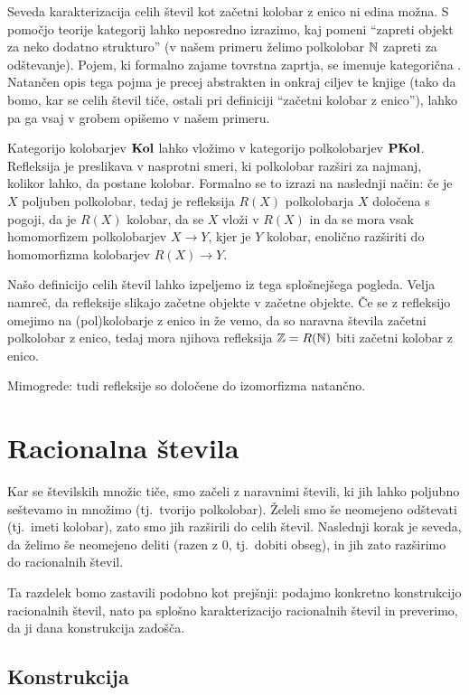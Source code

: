 Seveda karakterizacija celih števil kot začetni kolobar z enico ni edina možna. S pomočjo teorije kategorij lahko neposredno izrazimo, kaj pomeni ``zapreti objekt za neko dodatno strukturo'' (v našem primeru želimo polkolobar $\mathbb{N}$ zapreti za odštevanje). Pojem, ki formalno zajame tovrstna zaprtja, se imenuje kategorična . Natančen opis tega pojma je precej abstrakten in onkraj ciljev te knjige (tako da bomo, kar se celih števil tiče, ostali pri definiciji ``začetni kolobar z enico''), lahko pa ga vsaj v grobem opišemo v našem primeru.

Kategorijo kolobarjev $\mathbf{Kol}$ lahko vložimo v kategorijo polkolobarjev $\mathbf{PKol}$. Refleksija je preslikava v nasprotni smeri, ki polkolobar razširi za najmanj, kolikor lahko, da postane kolobar. Formalno se to izrazi na naslednji način: če je $X$ poljuben polkolobar, tedaj je refleksija $R(X)$ polkolobarja $X$ določena s pogoji, da je $R(X)$ kolobar, da se $X$ vloži v $R(X)$ in da se mora vsak homomorfizem polkolobarjev $X \to Y$, kjer je $Y$ kolobar, enolično razširiti do homomorfizma kolobarjev $R(X) \to Y$.

Našo definicijo celih števil lahko izpeljemo iz tega splošnejšega pogleda. Velja namreč, da refleksije slikajo začetne objekte v začetne objekte. Če se z refleksijo omejimo na (pol)kolobarje z enico in že vemo, da so naravna števila začetni polkolobar z enico, tedaj mora njihova refleksija $\mathbb{Z} = R(\mathbb{N})$ biti začetni kolobar z enico.

Mimogrede: tudi refleksije so določene do izomorfizma natančno.


\section{Racionalna števila}

Kar se številskih množic tiče, smo začeli z naravnimi števili, ki jih lahko poljubno seštevamo in množimo (tj.~tvorijo polkolobar). Želeli smo še neomejeno odštevati (tj.~imeti kolobar), zato smo jih razširili do celih števil. Naslednji korak je seveda, da želimo še neomejeno deliti (razen z $0$, tj.~dobiti obseg), in jih zato razširimo do racionalnih števil.

Ta razdelek bomo zastavili podobno kot prejšnji: podajmo konkretno konstrukcijo racionalnih števil, nato pa splošno karakterizacijo racionalnih števil in preverimo, da ji dana konstrukcija zadošča.

\subsection{Konstrukcija}

